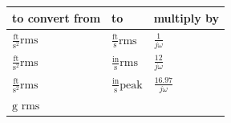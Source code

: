 \documentclass[
]{book}
\begin{document}
\begin{longtable}[]{@{}lll@{}}
\toprule
\begin{minipage}[b]{0.44\columnwidth}\raggedright
to convert from\strut
\end{minipage} & \begin{minipage}[b]{0.11\columnwidth}\raggedright
to\strut
\end{minipage} & \begin{minipage}[b]{0.36\columnwidth}\raggedright
multiply by\strut
\end{minipage}\tabularnewline
\midrule
\endhead
\begin{minipage}[t]{0.44\columnwidth}\raggedright
\(\frac{\text{ft}}{\text{s}^2} \text{rms}\)\strut
\end{minipage} & \begin{minipage}[t]{0.11\columnwidth}\raggedright
\(\frac{\text{ft}}{\text{s}} \text{rms}\)\strut
\end{minipage} & \begin{minipage}[t]{0.36\columnwidth}\raggedright
\(\frac{1}{j\omega}\)\strut
\end{minipage}\tabularnewline
\begin{minipage}[t]{0.44\columnwidth}\raggedright
\(\frac{\text{ft}}{\text{s}^2} \text{rms}\)\strut
\end{minipage} & \begin{minipage}[t]{0.11\columnwidth}\raggedright
\(\frac{\text{in}}{\text{s}} \text{rms}\)\strut
\end{minipage} & \begin{minipage}[t]{0.36\columnwidth}\raggedright
\(\frac{12}{j\omega}\)\strut
\end{minipage}\tabularnewline
\begin{minipage}[t]{0.44\columnwidth}\raggedright
\(\frac{\text{ft}}{\text{s}^2} \text{rms}\)\strut
\end{minipage} & \begin{minipage}[t]{0.11\columnwidth}\raggedright
\(\frac{\text{in}}{\text{s}} \text{peak}\)\strut
\end{minipage} & \begin{minipage}[t]{0.36\columnwidth}\raggedright
\(\frac{16.97}{j\omega}\)\strut
\end{minipage}\tabularnewline
\begin{minipage}[t]{0.44\columnwidth}\raggedright
\(\text{g rms}\)\strut
\end{minipage} & \begin{minipage}[t]{0.11\columnwidth}\raggedright

\end{minipage}
\end{longtable}
\end{document}
